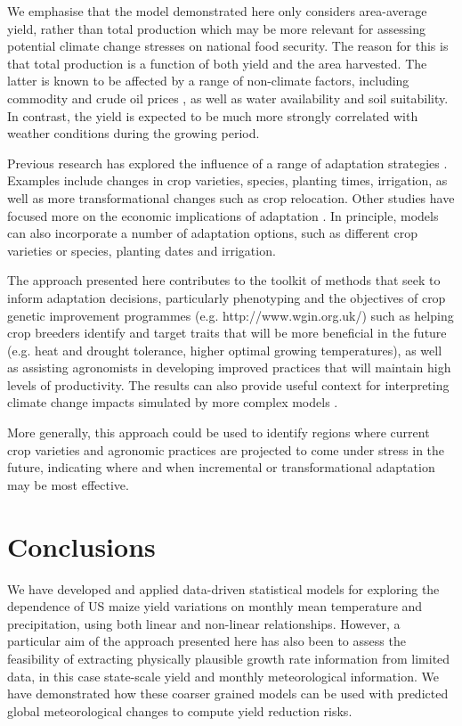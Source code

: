 \documentclass[12pt]{article}
\begin{document}
We emphasise that the model demonstrated here only considers area-average yield, rather than total production which may be more relevant for assessing potential climate change stresses on national food security. The reason for this is that total production is a function of both yield and the area harvested. The latter is known to be affected by a range of non-climate factors, including commodity and crude oil prices \citep[e.g.][]{Zafeiriou:2018}, as well as water availability and soil suitability. In contrast, the yield is expected to be much more strongly correlated with weather conditions during the growing period.

Previous research has explored the influence of a range of adaptation strategies \citep[e.g.][and references therein]{challinor:2014}. Examples include changes in crop varieties, species, planting times, irrigation, as well as more transformational changes such as crop relocation. Other studies have focused more on the economic implications of adaptation \citep{Seo:2008, schlenker:2013, Carter:2018, Dalhaus:2018}. In principle, models can also incorporate a number of adaptation options, such as different crop varieties or species, planting dates and irrigation. 

The approach presented here contributes to the toolkit of methods that seek to inform adaptation decisions, particularly phenotyping and the objectives of crop genetic improvement programmes (e.g. http://www.wgin.org.uk/) such as helping crop breeders identify and target traits that will be more beneficial in the future (e.g. heat and drought tolerance, higher optimal growing temperatures), as well as assisting agronomists in developing improved practices that will maintain high levels of productivity. The results can also provide useful context for interpreting climate change impacts simulated by more complex models \citep[e.g.][]{tigchelaar:2018, ostberg:2018}.

More generally, this approach could be used to identify regions where current crop varieties and agronomic practices are projected to come under stress in the future, indicating where and when incremental or transformational adaptation may be most effective.

\section{Conclusions}
\label{sec:conclusions}
We have developed and applied data-driven statistical models for exploring the dependence of US maize yield variations on monthly mean temperature and precipitation, using both linear and non-linear relationships. However, a particular aim of the approach presented here has also been to assess the feasibility of extracting physically plausible growth rate information from limited data, in this case state-scale yield and monthly meteorological information. We have demonstrated how these coarser grained models can be used with predicted global meteorological changes to compute yield reduction risks.
\end{document}
